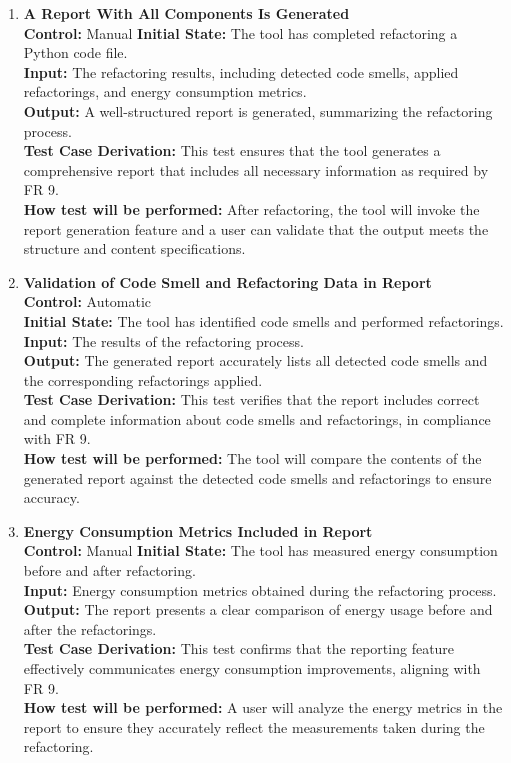 \documentclass[12pt, titlepage]{article}
\begin{document}
\begin{enumerate}[label={\bf \textcolor{Maroon}{test-FR-RP-\arabic*}}, wide=0pt, font=\itshape]
  \item \textbf{A Report With All Components Is Generated}\\[2mm]
    \textbf{Control:} Manual
    \textbf{Initial State:} The tool has completed refactoring a Python code file.\\
    \textbf{Input:} The refactoring results, including detected code smells, applied refactorings, and energy consumption metrics.\\
    \textbf{Output:} A well-structured report is generated, summarizing the refactoring process.\\[2mm]
    \textbf{Test Case Derivation:} This test ensures that the tool generates a comprehensive report that includes all necessary information as required by FR 9.\\[2mm]
    \textbf{How test will be performed:} After refactoring, the tool will invoke the report generation feature and a user can validate that the output meets the structure and content specifications.

  \item \textbf{Validation of Code Smell and Refactoring Data in Report}\\[2mm]
    \textbf{Control:} Automatic \\
    \textbf{Initial State:} The tool has identified code smells and performed refactorings.\\
    \textbf{Input:} The results of the refactoring process.\\
    \textbf{Output:} The generated report accurately lists all detected code smells and the corresponding refactorings applied.\\[2mm]
    \textbf{Test Case Derivation:} This test verifies that the report includes correct and complete information about code smells and refactorings, in compliance with FR 9.\\[2mm]
    \textbf{How test will be performed:} The tool will compare the contents of the generated report against the detected code smells and refactorings to ensure accuracy.

  \item \textbf{Energy Consumption Metrics Included in Report}\\[2mm]
    \textbf{Control:} Manual
    \textbf{Initial State:} The tool has measured energy consumption before and after refactoring.\\
    \textbf{Input:} Energy consumption metrics obtained during the refactoring process.\\
    \textbf{Output:} The report presents a clear comparison of energy usage before and after the refactorings.\\[2mm]
    \textbf{Test Case Derivation:} This test confirms that the reporting feature effectively communicates energy consumption improvements, aligning with FR 9.\\[2mm]
    \textbf{How test will be performed:} A user will analyze the energy metrics in the report to ensure they accurately reflect the measurements taken during the refactoring.


\end{enumerate}
\end{document}
